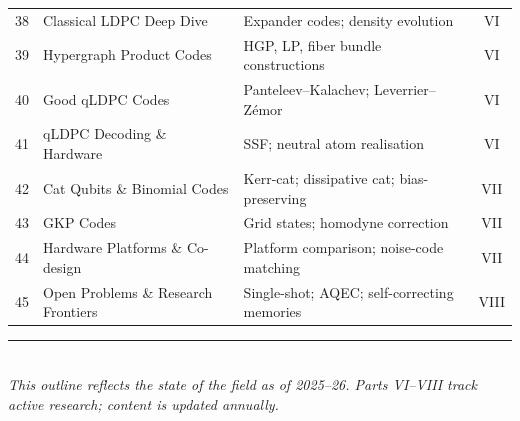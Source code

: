 \documentclass[12pt,oneside]{article}
\begin{document}
{\begin{longtable}{@{}cll c@{}}
  \midrule
  38 & Classical LDPC Deep Dive        & Expander codes; density evolution       & VI \\
  39 & Hypergraph Product Codes        & HGP, LP, fiber bundle constructions     & VI \\
  40 & Good qLDPC Codes                & Panteleev--Kalachev; Leverrier--Z{\'e}mor & VI \\
  41 & qLDPC Decoding \& Hardware      & SSF; neutral atom realisation           & VI \\
  \midrule
  42 & Cat Qubits \& Binomial Codes    & Kerr-cat; dissipative cat; bias-preserving & VII \\
  43 & GKP Codes                       & Grid states; homodyne correction        & VII \\
  44 & Hardware Platforms \& Co-design & Platform comparison; noise-code matching & VII \\
  \midrule
  45 & Open Problems \& Research Frontiers & Single-shot; AQEC; self-correcting memories & VIII \\
\end{longtable}
}

\vfill
\begin{center}
  \color{rulegray}\small
  \rule{0.5\textwidth}{0.4pt}\\[4pt]
  \textit{This outline reflects the state of the field as of 2025--26.
  Parts VI--VIII track active research; content is updated annually.}
\end{center}
\end{document}
